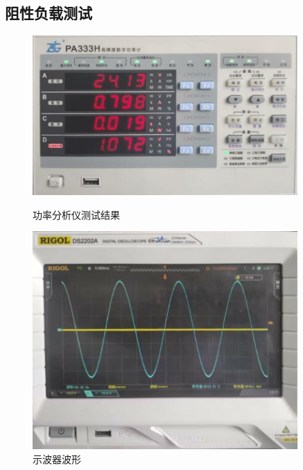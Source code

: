 \documentclass[a4paper,12pt]{article}
\begin{document}
\subsection*{阻性负载测试}
\begin{figure}[htbp]
    \centering
    \begin{minipage}{0.45\textwidth}
        \centering
        \includegraphics[width=0.9\textwidth]{src/result1.jpg}
        \caption{功率分析仪测试结果}
    \end{minipage}
    \qquad
    \begin{minipage}{0.45\textwidth}
        \centering
        \includegraphics[width=0.9\textwidth]{src/result2.jpg}
        \caption{示波器波形}
    \end{minipage}
\end{figure}
\end{document}
